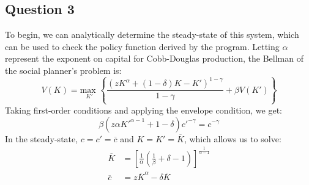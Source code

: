 \documentclass{article}
\newcommand{\usmax}[1]{\underset{#1}{\text{max }}}
\begin{document}
\subsection*{Question 3}
To begin, we can analytically determine the steady-state of this system, which can be used to check the policy function derived by the program. Letting $\alpha$ represent the exponent on capital for Cobb-Douglas production, the Bellman of the social planner's problem is:
\[
	V(K) = \usmax{K'}\left\{\frac{\left(zK^\alpha + (1-\delta)K -K'\right)^{1-\gamma}}{1-\gamma} + \beta V(K')\right\}
\]
Taking first-order conditions and applying the envelope condition, we get:
\[
	\beta\left(z\alpha K'^{\alpha-1}+1-\delta\right)c'^{-\gamma} = c^{-\gamma}
\]
In the steady-state, $c=c'=\overline{c}$ and $K=K'=\overline{K}$, which allows us to solve:
\begin{align*}
	\overline{K} &= \left[\frac{1}{\alpha}\left(\frac{1}{\beta} + \delta - 1\right)\right]^{\frac{1}{\alpha-1}}	\\
	\overline{c} &= z\overline{K}^\alpha - \delta\overline{K}
\end{align*}
\pagebreak
\end{document}
